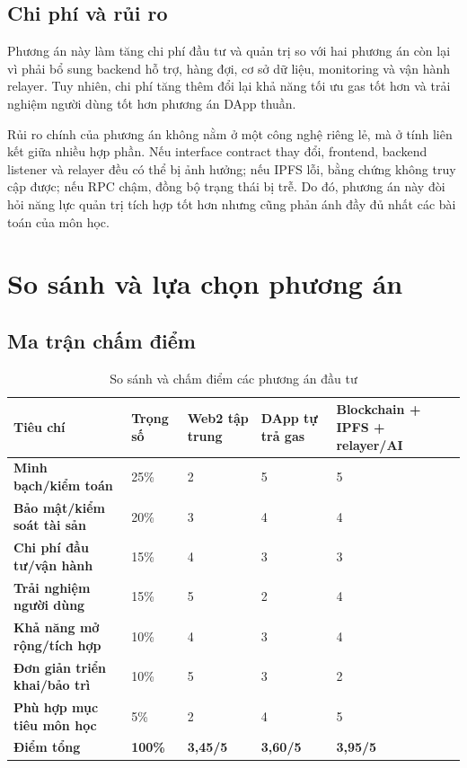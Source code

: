 \subsection{Chi phí và rủi ro}

Phương án này làm tăng chi phí đầu tư và quản trị so với hai phương án còn lại vì phải bổ sung backend hỗ trợ, hàng đợi, cơ sở dữ liệu, monitoring và vận hành relayer. Tuy nhiên, chi phí tăng thêm đổi lại khả năng tối ưu gas tốt hơn và trải nghiệm người dùng tốt hơn phương án DApp thuần.

Rủi ro chính của phương án không nằm ở một công nghệ riêng lẻ, mà ở tính liên kết giữa nhiều hợp phần. Nếu interface contract thay đổi, frontend, backend listener và relayer đều có thể bị ảnh hưởng; nếu IPFS lỗi, bằng chứng không truy cập được; nếu RPC chậm, đồng bộ trạng thái bị trễ. Do đó, phương án này đòi hỏi năng lực quản trị tích hợp tốt hơn nhưng cũng phản ánh đầy đủ nhất các bài toán của môn học.

\section{So sánh và lựa chọn phương án}

\subsection{Ma trận chấm điểm}

\begin{table}[H]
\centering
\small
\caption{So sánh và chấm điểm các phương án đầu tư}
\label{tab:alternative-scoring}
\begin{tabularx}{\textwidth}{| >{\bfseries}p{3.7cm} | p{1.4cm} | p{1.9cm} | p{1.9cm} | X |}
\hline
Tiêu chí & Trọng số & Web2 tập trung & DApp tự trả gas & Blockchain + IPFS + relayer/AI \\
\hline
Minh bạch/kiểm toán & 25\% & 2 & 5 & 5 \\ \hline
Bảo mật/kiểm soát tài sản & 20\% & 3 & 4 & 4 \\ \hline
Chi phí đầu tư/vận hành & 15\% & 4 & 3 & 3 \\ \hline
Trải nghiệm người dùng & 15\% & 5 & 2 & 4 \\ \hline
Khả năng mở rộng/tích hợp & 10\% & 4 & 3 & 4 \\ \hline
Đơn giản triển khai/bảo trì & 10\% & 5 & 3 & 2 \\ \hline
Phù hợp mục tiêu môn học & 5\% & 2 & 4 & 5 \\
\hline
\textbf{Điểm tổng} & \textbf{100\%} & \textbf{3,45/5} & \textbf{3,60/5} & \textbf{3,95/5} \\
\hline
\end{tabularx}
\end{table}

